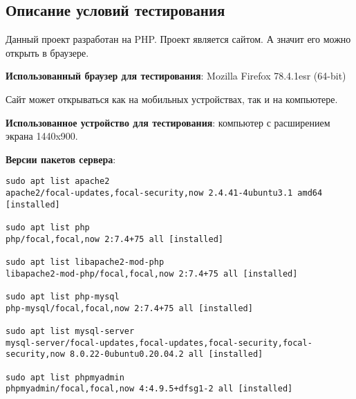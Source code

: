 \subsection{Описание условий тестирования}

Данный проект разработан на PHP. Проект является сайтом. А значит его можно открыть в браузере.

\textbf{Использованный браузер для тестирования}: Mozilla Firefox 78.4.1esr (64-bit)

Сайт может открываться как на мобильных устройствах, так и на компьютере.

\textbf{Использованное устройство для тестирования}: компьютер с расширением экрана 1440x900.

\textbf{Версии пакетов сервера}:

\begin{lstlisting}[breaklines=true]
sudo apt list apache2
apache2/focal-updates,focal-security,now 2.4.41-4ubuntu3.1 amd64 [installed]

sudo apt list php
php/focal,focal,now 2:7.4+75 all [installed]

sudo apt list libapache2-mod-php
libapache2-mod-php/focal,focal,now 2:7.4+75 all [installed]

sudo apt list php-mysql
php-mysql/focal,focal,now 2:7.4+75 all [installed]

sudo apt list mysql-server
mysql-server/focal-updates,focal-updates,focal-security,focal-security,now 8.0.22-0ubuntu0.20.04.2 all [installed]

sudo apt list phpmyadmin
phpmyadmin/focal,focal,now 4:4.9.5+dfsg1-2 all [installed]
\end{lstlisting}

\newpage